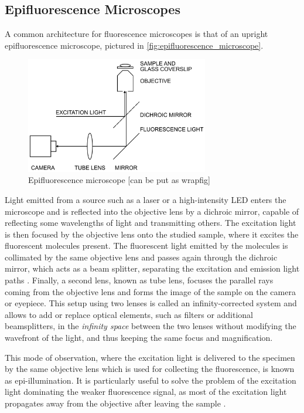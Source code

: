 \subsection{Epifluorescence Microscopes} \label{sec:epifluorescence_microscopes}
A common architecture for fluorescence microscopes is that of an upright epifluorescence microscope, pictured in \autoref{fig:epifluorescence_microscope}.

\begin{figure}[htbp]  
    \centering
    \includegraphics[width=8cm]{figures/epifluorescence-microscope.png}
    \caption{Epifluorescence microscope \cite{douglass_notice_2023} [can be put as wrapfig]}
    \label{fig:epifluorescence_microscope}
\end{figure}

Light emitted from a source such as a laser or a high-intensity LED enters the microscope and is reflected into the objective lens by a dichroic mirror, capable of reflecting some wavelengths of light and transmitting others.
The excitation light is then focused by the objective lens onto the studied sample, where it excites the fluorescent molecules present.
The fluorescent light emitted by the molecules is collimated by the same objective lens and passes again through the dichroic mirror, which acts as a beam splitter, separating the excitation and emission light paths \cite{sachl_introduction_2022}.
Finally, a second lens, known as tube lens, focuses the parallel rays coming from the objective lens and forms the image of the sample on the camera or eyepiece.
This setup using two lenses is called an infinity-corrected system and allows to add or replace optical elements, such as filters or additional beamsplitters, in the \emph{infinity space} between the two lenses  without modifying the wavefront of the light, and thus keeping the same focus and magnification.

This mode of observation, where the excitation light is delivered to the specimen by the same objective lens which is used for collecting the fluorescence, is known as epi-illumination.
It is particularly useful to solve the problem of the excitation light dominating the weaker fluorescence signal, as most of the excitation light propagates away from the objective after leaving the sample \cite{douglass_notice_2023}.

